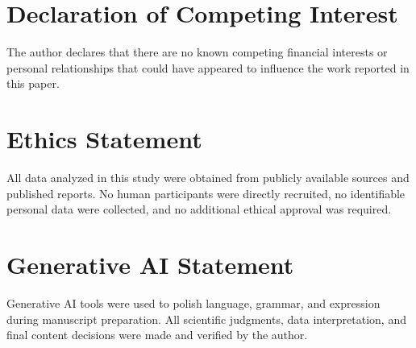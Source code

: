 \documentclass[preprint]{elsarticle}
\begin{document}
\section*{Declaration of Competing Interest}
The author declares that there are no known competing financial interests or personal relationships that could have appeared to influence the work reported in this paper.

\section*{Ethics Statement}
All data analyzed in this study were obtained from publicly available sources and published reports. No human participants were directly recruited, no identifiable personal data were collected, and no additional ethical approval was required.

\section*{Generative AI Statement}
Generative AI tools were used to polish language, grammar, and expression during manuscript preparation. All scientific judgments, data interpretation, and final content decisions were made and verified by the author.
\end{document}
